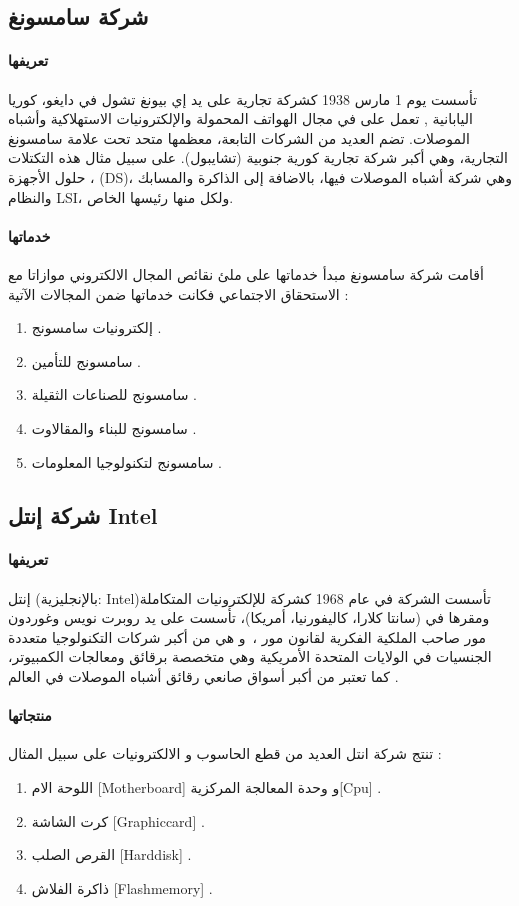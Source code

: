 \subsection{ شركة سامسونغ }

\paragraph{تعريفها}
تأسست يوم 1 مارس 1938 كشركة تجارية على يد إي بيونغ تشول في دايغو، كوريا اليابانية , تعمل على  في مجال الهواتف المحمولة والإلكترونيات الاستهلاكية وأشباه الموصلات. تضم العديد من الشركات التابعة، معظمها متحد تحت علامة سامسونغ التجارية، وهي أكبر شركة تجارية كورية جنوبية (تشايبول). على سبيل مثال هذه التكتلات ، حلول الأجهزة (DS)، وهي شركة أشباه الموصلات فيها، بالاضافة إلى الذاكرة والمسابك والنظام LSI، ولكل منها رئيسها الخاص. \cite{a8}

\paragraph{خدماتها} أقامت شركة سامسونغ مبدأ خدماتها على ملئ نقائص المجال الالكتروني موازاتا مع الاستحقاق الاجتماعي فكانت خدماتها ضمن المجالات اﻵتية :
\begin{enumerate}
	\item
	إلكترونيات سامسونج .
	\item
	سامسونج للتأمين .
	\item
	سامسونج للصناعات الثقيلة .
	\item
	سامسونج للبناء والمقالاوت .
	\item
	سامسونج لتكنولوجيا المعلومات . \cite{a8}
\end{enumerate}

\subsection{ شركة إنتل  Intel }

\paragraph{تعريفها}
إنتل (بالإنجليزية: Intel)‏ تأسست الشركة في عام 1968 كشركة للإلكترونيات المتكاملة ومقرها في (سانتا كلارا، كاليفورنيا، أمريكا)، تأسست على يد روبرت نويس وغوردون مور صاحب الملكية الفكرية لقانون مور ، و هي من أكبر شركات التكنولوجيا متعددة الجنسيات في الولايات المتحدة الأمريكية وهي متخصصة برقائق ومعالجات الكمبيوتر، كما تعتبر من أكبر أسواق صانعي رقائق أشباه الموصلات في العالم . \cite{a9}

\paragraph{منتجاتها}
تنتج شركة انتل العديد من قطع الحاسوب و الالكترونيات على سبيل المثال :
\begin{enumerate}
	\item
	اللوحة الام [Motherboard] و وحدة المعالجة المركزية[Cpu] .
	\item
	كرت الشاشة [Graphiccard] .
	\item
	القرص الصلب [Harddisk] .
	\item
	 ذاكرة الفلاش [Flashmemory] .
	
\end{enumerate}
